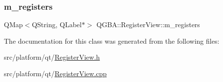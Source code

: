 \mbox{\label{class_q_g_b_a_1_1_register_view_aca0407ad2db187447ea14f8e3ac82c8d}} 
\subsubsection{\texorpdfstring{m\+\_\+registers}{m\_registers}}
{\footnotesize\ttfamily Q\+Map$<$Q\+String, Q\+Label$\ast$$>$ Q\+G\+B\+A\+::\+Register\+View\+::m\+\_\+registers\hspace{0.3cm}{\ttfamily [private]}}



The documentation for this class was generated from the following files\+:\begin{DoxyCompactItemize}
\item 
src/platform/qt/\mbox{\hyperlink{_register_view_8h}{Register\+View.\+h}}\item 
src/platform/qt/\mbox{\hyperlink{_register_view_8cpp}{Register\+View.\+cpp}}\end{DoxyCompactItemize}
